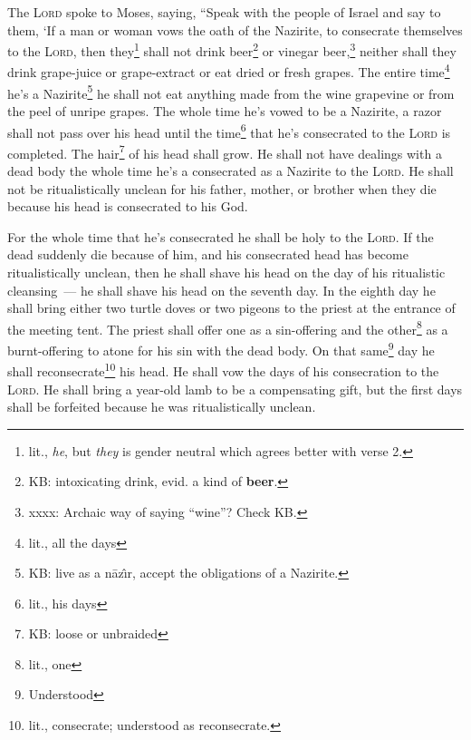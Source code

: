 
\begin{enumerate*}[mode=unboxed]
     The \textsc{Lord} spoke to Moses, saying,%
     ``Speak with the people of Israel and say to them, `If a man or woman vows the oath of the Nazirite, to consecrate themselves to the \textsc{Lord},%
     then they\footnote{lit., \textit{he}, but \textit{they} is gender neutral which agrees better with verse 2.} shall not drink beer\footnote{KB: intoxicating drink, evid\@. a kind of \textbf{beer}.} or vinegar beer,\footnote{xxxx: Archaic way of saying ``wine''? Check KB.} neither shall they drink grape-juice or grape-extract or eat dried or fresh grapes.%
     The entire time\footnote{lit., all the days} he's a Nazirite\footnote{KB: live as a n\=az\^\i{}r, accept the obligations of a Nazirite.} he shall not eat anything made from the wine grapevine or from the peel of unripe grapes.%
     The whole time he's vowed to be a Nazirite, a razor shall not pass over his head until the time\footnote{lit., his days} that he's consecrated to the \textsc{Lord} is completed. The hair\footnote{KB: loose or unbraided} of his head shall grow.%
     He shall not have dealings with a dead body the whole time he's a consecrated as a Nazirite to the \textsc{Lord}.%
     He shall not be ritualistically unclean for his father, mother, or brother when they die because his head is consecrated to his God.%
    
     For the whole time that he's consecrated he shall be holy to the \textsc{Lord}.%
     If the dead suddenly die because of him, and his consecrated head has become ritualistically unclean, then he shall shave his head on the day of his ritualistic cleansing~--- he shall shave his head on the seventh day.%
     In the eighth day he shall bring either two turtle doves or two pigeons to the priest at the entrance of the meeting tent.%
     The priest shall offer one as a sin-offering and the other\footnote{lit., one} as a burnt-offering to atone for his sin with the dead body. On that same\footnote{Understood} day he shall reconsecrate\footnote{lit., consecrate; understood as reconsecrate.} his head.%
     He shall vow the days of his consecration to the \textsc{Lord}. He shall bring a year-old lamb to be a compensating gift, but the first days shall be forfeited because he was ritualistically unclean.%
    

\end{enumerate*}
